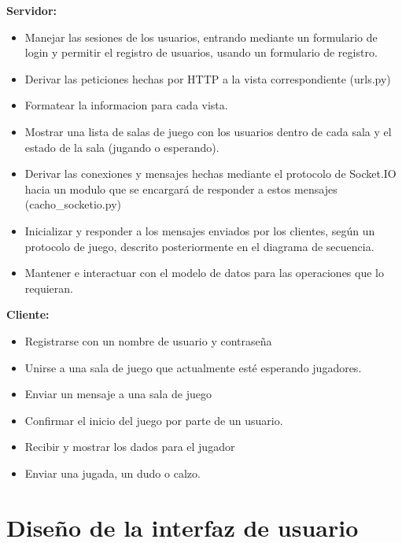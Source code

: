\documentclass[a4paper,11pt]{article}
\begin{document}
\textbf{Servidor:}
\begin{itemize}
	\item Manejar las sesiones de los usuarios, entrando
	mediante un formulario de login y permitir el registro de usuarios,
	usando un formulario de registro.
	\item Derivar las peticiones hechas por HTTP a la vista
	correspondiente (urls.py)
	\item Formatear la informacion para cada vista.
	\item Mostrar una lista de salas de juego con los usuarios
	dentro de cada sala y el estado de la sala (jugando o esperando).
	\item Derivar las conexiones y mensajes hechas mediante el 
	protocolo de Socket.IO hacia un modulo que se encargará de responder
	a estos mensajes (cacho\_socketio.py)
	\item Inicializar y responder a los mensajes enviados por los clientes,
	según un protocolo de juego, descrito posteriormente en el 
	diagrama de secuencia.
	\item Mantener e interactuar con el modelo de datos para las
	operaciones que lo requieran.
\end{itemize}
\vspace{0.7cm}
\textbf{Cliente:}
\begin{itemize}
	\item Registrarse con un nombre de usuario y contraseña
	\item Unirse a una sala de juego que actualmente esté esperando
	jugadores.
	\item Enviar un mensaje a una sala de juego
	\item Confirmar el inicio del juego por parte de un usuario.
	\item Recibir y mostrar los dados para el jugador
	\item Enviar una jugada, un dudo o calzo.
\end{itemize}
\newpage

\section{Diseño de la interfaz de usuario}
\end{document}
